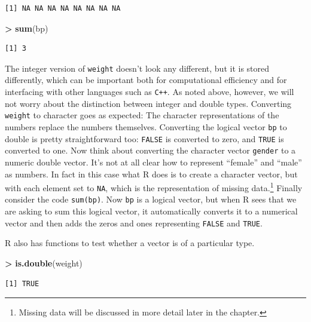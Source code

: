 \documentclass[
]{krantz}
\makeatletter
\newenvironment{Shaded}{\begin{snugshade}}{\end{snugshade}}
\newcommand{\KeywordTok}[1]{\textcolor[rgb]{0.27,0.27,0.27}{\textbf{#1}}}
\newcommand{\NormalTok}[1]{#1}
\newcommand{\OperatorTok}[1]{\textcolor[rgb]{0.43,0.43,0.43}{\textbf{#1}}}
\newcommand{\StringTok}[1]{\textcolor[rgb]{0.5,0.5,0.5}{#1}}
\newenvironment{kframe}{%
\medskip{}
\setlength{\fboxsep}{.8em}
 \def\at@end@of@kframe{}%
 \ifinner\ifhmode%
  \def\at@end@of@kframe{\end{minipage}}%
  \begin{minipage}{\columnwidth}%
 \fi\fi%
 \def\FrameCommand##1{\hskip\@totalleftmargin \hskip-\fboxsep
 \colorbox{shadecolor}{##1}\hskip-\fboxsep
     \hskip-\linewidth \hskip-\@totalleftmargin \hskip\columnwidth}%
 \MakeFramed {\advance\hsize-\width
   \@totalleftmargin\z@ \linewidth\hsize
   \@setminipage}}%
 {\par\unskip\endMakeFramed%
 \at@end@of@kframe}
\renewenvironment{Shaded}{\begin{kframe}}{\end{kframe}}
\makeatother
\begin{document}
\begin{verbatim}
[1] NA NA NA NA NA NA NA NA
\end{verbatim}

\begin{Shaded}
\begin{Highlighting}[]
\OperatorTok{\textgreater{}}\StringTok{ }\KeywordTok{sum}\NormalTok{(bp)}
\end{Highlighting}
\end{Shaded}

\begin{verbatim}
[1] 3
\end{verbatim}

The integer version of \texttt{weight} doesn't look any different, but it is stored differently, which can be important both for computational efficiency and for interfacing with other languages such as \texttt{C++}. As noted above, however, we will not worry about the distinction between integer and double types. Converting \texttt{weight} to character goes as expected: The character representations of the numbers replace the numbers themselves. Converting the logical vector \texttt{bp} to double is pretty straightforward too: \texttt{FALSE} is converted to zero, and \texttt{TRUE} is converted to one. Now think about converting the character vector \texttt{gender} to a numeric double vector. It's not at all clear how to represent ``female'' and ``male'' as numbers. In fact in this case what R does is to create a character vector, but with each element set to \texttt{NA}, which is the representation of missing data.\footnote{Missing data will be discussed in more detail later in the chapter.} Finally consider the code \texttt{sum(bp)}. Now \texttt{bp} is a logical vector, but when R sees that we are asking to sum this logical vector, it automatically converts it to a numerical vector and then adds the zeros and ones representing \texttt{FALSE} and \texttt{TRUE}.

R also has functions to test whether a vector is of a particular type.

\begin{Shaded}
\begin{Highlighting}[]
\OperatorTok{\textgreater{}}\StringTok{ }\KeywordTok{is.double}\NormalTok{(weight)}
\end{Highlighting}
\end{Shaded}

\begin{verbatim}
[1] TRUE
\end{verbatim}
\end{document}
